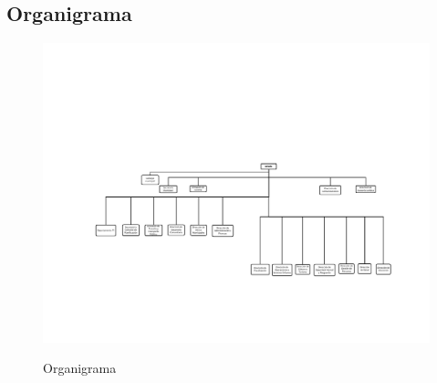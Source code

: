 
\subsection{Organigrama}

\begin{figure}[H]
	\centering
	\includegraphics[width=1\textwidth]{fragments/01structure/organigramaMunicipalidad.pdf}\\
\caption{Organigrama}
\label{FIG:ORGANIGRAMA}
\end{figure}


